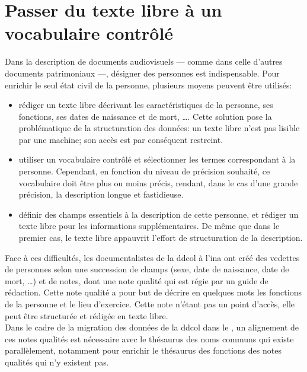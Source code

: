 \section[Passer du texte libre à un vocabulaire contrôlé: aligner des notes qualités et un thésaurus de noms communs]{\label{I-C-3}Passer du texte libre à un vocabulaire contrôlé}

Dans la description de documents audiovisuels --- comme dans celle d'autres documents patrimoniaux ---, désigner des personnes est indispensable. Pour enrichir le seul état civil de la personne, plusieurs moyens peuvent être utilisés:
\begin{itemize}
	\item rédiger un texte libre décrivant les caractéristiques de la personne, ses fonctions, ses dates de naissance et de mort, \dots. Cette solution pose la problématique de la structuration des données: un texte libre n'est pas lisible par une machine; son accès est par conséquent restreint.
	\item utiliser un vocabulaire contrôlé et sélectionner les termes correspondant à la personne. Cependant, en fonction du niveau de précision souhaité, ce vocabulaire doit être plus ou moins précis, rendant, dans le cas d'une grande précision, la description longue et fastidieuse.
	\item définir des champs essentiels à la description de cette personne, et rédiger un texte libre pour les informations supplémentaires. De même que dans le premier cas, le texte libre appauvrit l'effort de structuration de la description.
\end{itemize}
Face à ces difficultés, les documentalistes de la \ac{ddcol} à l'\ac{ina} ont créé des vedettes de personnes selon une succession de champs (sexe, date de naissance, date de mort, \dots) et de notes, dont une note qualité qui est régie par un guide de rédaction. Cette note qualité a pour but de décrire en quelques mots les fonctions de la personne et le lieu d'exercice. Cette note n'étant pas un point d'accès, elle peut être structurée et rédigée en texte libre.\\

Dans le cadre de la migration des données de la \ac{ddcol} dans le \ldd, un alignement de ces notes qualités est nécessaire avec le thésaurus des noms communs qui existe parallèlement, notamment pour enrichir le thésaurus des fonctions des notes qualités qui n'y existent pas.

